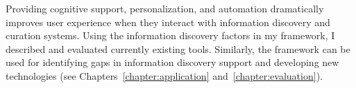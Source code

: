 Providing cognitive support, personalization, and automation dramatically improves user experience when they interact with information discovery and curation systems. Using the information discovery factors in my framework, I described and evaluated currently existing tools. Similarly, the framework can be used for identifying gaps in information discovery support and developing new technologies (see Chapters~\ref{chapter:application} and~\ref{chapter:evaluation}).  